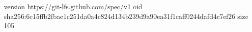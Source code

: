 version https://git-lfs.github.com/spec/v1
oid sha256:6c15ffb2fbac1c251da0a4c824d134b239d9a90ea31f1caff0244dafd4c7ef26
size 105
